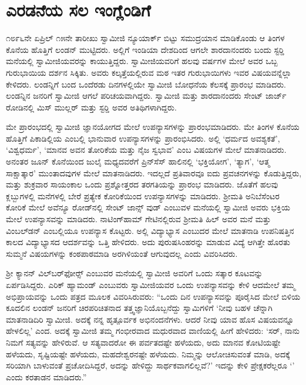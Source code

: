 
\chapter{ಎರಡನೆಯ ಸಲ ಇಂಗ್ಲೆಂಡಿಗೆ}

 ೧೮೯೬ನೇ ಏಪ್ರಿಲ್ ೧೫ನೇ ತಾರೀಖು ಸ್ವಾಮೀಜಿ ನ್ಯೂಯಾರ್ಕ್ ಬಿಟ್ಟು ಸಮುದ್ರಯಾನ ಮಾಡಿಕೊಂಡು ಆ ತಿಂಗಳ ಕೊನೆಯ ಹೊತ್ತಿಗೆ ಲಂಡನ್ ಮುಟ್ಟಿದರು. ಅಲ್ಲಿಗೆ ಇಂಡಿಯಾ ದೇಶದಿಂದ ಆಗಲೇ ಶಾರದಾನಂದರು ಬಂದು ಸ್ಟರ‍್ಡಿ ಮನೆಯಲ್ಲಿ ಸ್ವಾಮೀಜಿಯವರನ್ನು ಕಾಯುತ್ತಿದ್ದರು. ಸ್ವಾಮೀಜಿಯವರಿಗೆ ಹಲವು ವರ್ಷಗಳ ಮೇಲೆ ಅವರ ಒಬ್ಬ ಗುರುಭಾಯಿಯ ದರ್ಶನ ಸಿಕ್ಕಿತು. ಅವರು ಕಲ್ಕತ್ತೆಯಲ್ಲಿರುವ ಮಠ ಇತರ ಗುರುಭಾಯಿಗಳು ಇವರ ವಿಷಯವನ್ನೆಲ್ಲಾ ಕೇಳಿದರು. ಲಂಡನ್ನಿಗೆ ಬಂದ ಒಂದೆರಡು ದಿನಗಳಲ್ಲಿಯೇ ಸ್ವಾಮೀಜಿ ಬೋಧನೆಯ ಕೆಲಸಕ್ಕೆ ಪ್ರಾರಂಭ ಮಾಡಿದರು. ಲಂಡನ್ನಿನ ಜನರಿಗೆ ಸ್ವಾಮೀಜಿ ಆಗಲೆ ಪರಿಚಯವಾಗಿದ್ದರು. ಸ್ವಾಮೀಜಿ ಮತ್ತು ಶಾರದಾನಂದರು ಸೇಂಟ್ ಜಾರ್ಜ್ ರೋಡಿನಲ್ಲಿ ಮಿಸ್ ಮುಲ್ಲರ್ ಮತ್ತು ಸ್ಟರ‍್ಡಿ ಅವರ ಅತಿಥಿಗಳಾಗಿದ್ದರು. 

 ಮೇ ಪ್ರಾರಂಭದಲ್ಲಿ ಸ್ವಾಮೀಜಿ ಜ್ಞಾನಯೋಗದ ಮೇಲೆ ಉಪನ್ಯಾಸಗಳನ್ನು ಪ್ರಾರಂಭಮಾಡಿದರು. ಮೇ ತಿಂಗಳ ಕೊನೆಯ ಹೊತ್ತಿಗೆ ಪಿಕಾಡಿಲ್ಲಿಯ  ಎಂಬಲ್ಲಿ ಭಾನುವಾರ ಉಪನ್ಯಾಸಗಳನ್ನು ಪ್ರಾರಂಭಿಸಿದರು. ಅಲ್ಲಿ ‘ಧರ್ಮದ ಅವಶ್ಯಕತೆ’, ‘ವಿಶ್ವಧರ್ಮ’, ‘ಮಾನವ ಅವನ ತೋರಿಕೆಯ ಮತ್ತು ನೈಜ ಸ್ವಭಾವ’ ಎಂಬ ವಿಷಯಗಳ ಮೇಲೆ ಮಾತನಾಡಿದರು. ಅನಂತರ ಜೂನ್ ಕೊನೆಯಿಂದ ಜುಲೈ ಮಧ್ಯದವರೆಗೆ ಪ್ರಿನ್‍ಸೆಸ್ ಹಾಲಿನಲ್ಲಿ ‘ಭಕ್ತಿಯೋಗ’, ‘ತ್ಯಾಗ’, ‘ಆತ್ಮ ಸಾಕ್ಷಾತ್ಕಾರ’ ಮುಂತಾದವುಗಳ ಮೇಲೆ ಮಾತನಾಡಿದರು. ಇದಲ್ಲದೆ ಪ್ರತಿವಾರವೂ ಐದು ಪ್ರವಚನಗಳನ್ನು ಕೊಡುತ್ತಿದ್ದರು, ಮತ್ತು ಶುಕ್ರವಾರ ಸಾಯಂಕಾಲ ಒಂದು ಪ್ರಶ್ನೋತ್ತರದ ತರಗತಿಯನ್ನು ಪ್ರಾರಂಭ ಮಾಡಿದರು. ಜೊತೆಗೆ ಹಲವು ಕ್ಲಬ್ಬುಗಳಲ್ಲಿ ಮನೆಗಳಲ್ಲಿ ಬೇರೆ ಪ್ರತ್ಯೇಕ ಕೋರಿಕೆಯಿಂದ ಉಪನ್ಯಾಸಗಳನ್ನು ಮಾಡಿದರು. ಶ‍್ರೀಮತಿ ಅನಿಬೆಸೆಂಟರ ಕೋರಿಕೆ ಮೇಲೆ ಅವೆನ್ಯೂ ರೋಡ್‍ನಲ್ಲಿ ಸೇಂಟ್ ಜಾನ್ಸ್ ವುಡ್ ಎಂಬುವಳ ಮನೆಯಲ್ಲಿ ಸ್ವಾಮೀಜಿ ಅವರು ಭಕ್ತಿಯ ಮೇಲೆ ಉಪನ್ಯಾಸವನ್ನು ಮಾಡಿದರು. ನಾಟಿಂಗ್‍ಹಾಮ್ ಗೇಟಿನಲ್ಲಿರುವ ಶ‍್ರೀಮತಿ ಹಿಲ್ ಅವರ ಮನೆ ಮತ್ತು ವಿಂಬಲ್‍ಡನ್ ಎಂಬಲ್ಲಿಯೂ ಉಪನ್ಯಾಸ ಕೊಟ್ಟರು. ಅಲ್ಲಿ ವಿದ್ಯಾಭ್ಯಾಸ ಎಂಬುದರ ಮೇಲೆ ಮಾತನಾಡಿ ಉಪನಿಷತ್ತಿನ ಕಾಲದ ವಿದ್ಯಾಭ್ಯಾಸದ ಆದರ್ಶವನ್ನು ಒತ್ತಿ ಹೇಳಿದರು. ಅದು ಪುರುಷಸಿಂಹರನ್ನು ಮಾಡುವ ವಿದ್ಯೆ ಆಗಿತ್ತೇ ಹೊರತು ಸುಮ್ಮನೆ ವಿಷಯಗಳನ್ನು ಕಂಠಪಾಠಮಾಡಿ ಅರಗಿಳಿಯಂತೆ ಆಗುವುದಲ್ಲ ಎಂದು ವಿವರಿಸಿದರು. 

 ಶ‍್ರೀ ಕ್ಯಾನನ್ ವಿಲ್‌ಬರ್‌ಫೋರ್ಸ್‍ ಎಂಬುವರ ಮನೆಯಲ್ಲಿ ಸ್ವಾಮೀಜಿ ಅವರಿಗೆ ಒಂದು ಸತ್ಕಾರ ಕೂಟವನ್ನು ಏರ್ಪಡಿಸಿದ್ದರು. ಎರಿಕ್ ಹ್ಯಾಮಂಡ್ ಎಂಬುವರು ಸ್ವಾಮೀಜಿಯವರ ಒಂದು ಉಪನ್ಯಾಸವನ್ನು ಕೇಳಿ ಆದಮೇಲೆ ತಮ್ಮ ಅಭಿಪ್ರಾಯವನ್ನು ಒಂದು ಪತ್ರದ ಮೂಲಕ ವಿವರಿಸಿರುವರು: “ಒಂದು ದಿನ ಉಪನ್ಯಾಸವನ್ನು ಪೂರೈಸಿದ ಮೇಲೆ ಬಿಳಿಯ ಕೂದಲಿನ ಲಂಡನ್ ಜನರಿಗೆ ಚಿರಪರಿಚಿತನಾದ ತತ್ತ್ವಜ್ಞಾನಿಯೊಬ್ಬನೆದ್ದು ಸ್ವಾಮಿಗಳಿಗೆ ‘ನೀವು ಬಹಳ ಚೆನ್ನಾಗಿ ಮಾತನಾಡಿದಿರಿ ಸ್ವಾಮೀಜಿ. ಅದಕ್ಕೆ ನನ್ನ ಹೃತ್ಪೂರ್ವಕ ಅಭಿನಂದನೆಗಳು. ಆದರೆ ನೀವು ಯಾವ ಹೊಸ ವಿಷಯವನ್ನೂ ಹೇಳಲಿಲ್ಲ’ ಎಂದ. ಅದಕ್ಕೆ ಸ್ವಾಮೀಜಿ ತಮ್ಮ ಗಂಭೀರವಾದ ಮಧುರವಾದ ವಾಣಿಯಲ್ಲಿ ಹೀಗೆ ಹೇಳಿದರು: ‘ಸರ್, ನಾನು ನಿಮಗೆ ಸತ್ಯವನ್ನು ಹೇಳಿರುವೆ. ಆ ಸತ್ಯವಾದರೋ ಈ ಪರ್ವತದಷ್ಟೇ ಹಳೆಯದು, ಅದು ಮಾನವ ಕೋಟಿಯಷ್ಟೇ ಹಳೆಯದು, ಸೃಷ್ಟಿಯಷ್ಟೇ ಹಳೆಯದು, ಮಹದೇಶ್ವರನಷ್ಟೇ ಹಳೆಯದು. ನಿಮ್ಮನ್ನು ಆಲೋಚಿಸುವಂತೆ ಮಾಡಿ, ಅದಕ್ಕೆ ಸರಿಯಾಗಿ ಬಾಳುವಂತೆ ಪ್ರಚೋದಿಸಿದ್ದರೆ, ಅದನ್ನು ಹೇಳಿದ್ದು ಸಾರ್ಥಕವಾಗಲಿಲ್ಲವೆ?’ ಇದನ್ನು ಕೇಳಿ ಪ್ರೇಕ್ಷಕರೆಲ್ಲರೂ ‘’ ಎಂದು ಕರತಾಡನ ಮಾಡಿದರು.” 

